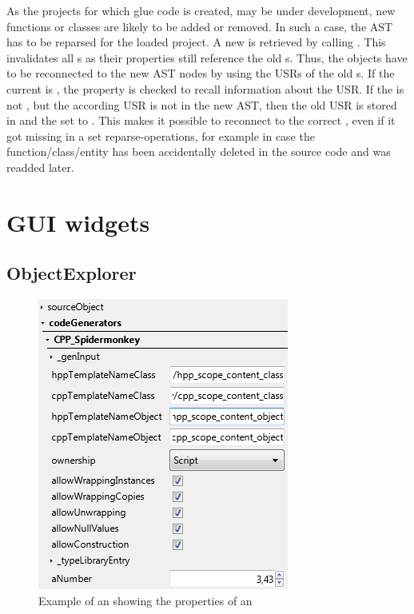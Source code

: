 As the  projects for which glue code is created, may be under development, new functions or classes are likely to be added or removed. In such a case, the  AST has to be reparsed for the loaded project. A new  is retrieved by calling . This invalidates all s as their  properties still reference the old s. Thus, the objects have to be reconnected to the new AST nodes by using the USRs of the old s. If the current  is , the  property is checked to recall information about the USR. If the  is not , but the according USR is not in the new AST, then the old USR is stored in  and the  set to . This makes it possible to reconnect to the correct , even if it got missing in a set reparse-operations, for example in case the  function/class/entity has been accidentally deleted in the source code and was readded later.

\section{GUI widgets}

\subsection{ObjectExplorer}
\label{sec:ObjectExplorer}

\begin{figure}
  \vspace{-20pt}
  \begin{center}
    \includegraphics[scale=0.60]{Images/ObjectExplorer.png}
  \end{center}
  \caption{Example of an  showing the properties of an }
  \label{fig:ObjectExplorer}
  \vspace{-15pt}
\end{figure}

